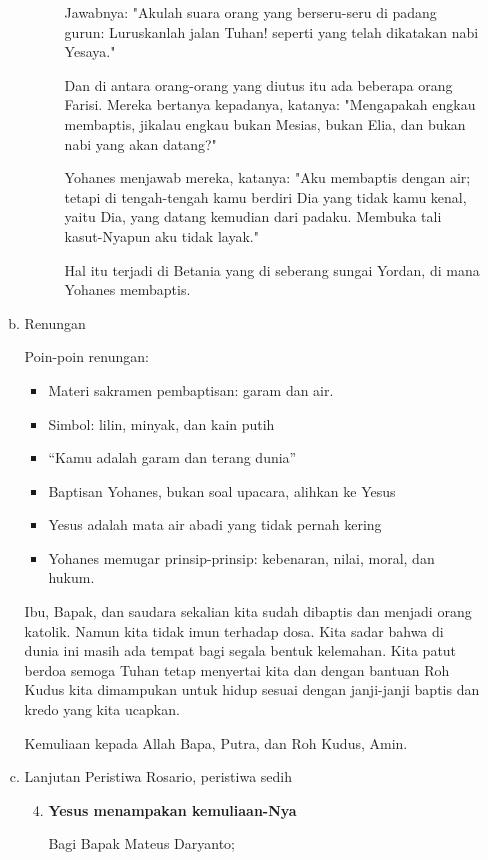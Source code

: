\documentclass[a5paper,titlepage,12pt]{scrbook}
\begin{document}
\begin{itemize}
\begin{enumerate}[a.]
\begin{description}
Jawabnya: "Akulah suara orang yang berseru-seru di padang gurun: Luruskanlah jalan Tuhan! seperti yang telah dikatakan nabi Yesaya."

Dan di antara orang-orang yang diutus itu ada beberapa orang Farisi.
Mereka bertanya kepadanya, katanya: "Mengapakah engkau membaptis, jikalau engkau bukan Mesias, bukan Elia, dan bukan nabi yang akan datang?"

Yohanes menjawab mereka, katanya: "Aku membaptis dengan air; tetapi di tengah-tengah kamu berdiri Dia yang tidak kamu kenal,
yaitu Dia, yang datang kemudian dari padaku. Membuka tali kasut-Nyapun aku tidak layak."

Hal itu terjadi di Betania yang di seberang sungai Yordan, di mana Yohanes membaptis.

 
			\end{description}

		\item Renungan

Poin-poin renungan:
\begin{itemize}
\item Materi sakramen pembaptisan: garam dan air.
\item Simbol: lilin, minyak, dan kain putih
\item ``Kamu adalah garam dan terang dunia''
\item Baptisan Yohanes, bukan soal upacara, alihkan ke Yesus
\item Yesus adalah mata air abadi yang tidak pernah kering
\item Yohanes memugar prinsip-prinsip: kebenaran, nilai, moral, dan hukum.
\end{itemize}

Ibu, Bapak, dan saudara sekalian kita sudah dibaptis dan menjadi orang katolik. Namun kita tidak imun terhadap dosa. Kita sadar bahwa di dunia ini masih ada tempat bagi segala bentuk kelemahan. Kita patut berdoa semoga Tuhan tetap menyertai kita dan dengan bantuan Roh Kudus kita dimampukan untuk hidup sesuai dengan janji-janji baptis dan kredo yang kita ucapkan.

Kemuliaan kepada Allah Bapa, Putra, dan Roh Kudus, Amin.

	\item Lanjutan Peristiwa Rosario, peristiwa sedih 
		\begin{enumerate}[{Peristiwa }I.]
		    \setcounter{enumii}{3}
			\item \textbf{Yesus menampakan kemuliaan-Nya}

Bagi Bapak Mateus Daryanto;


\end{enumerate}
\end{enumerate}
\end{itemize}
\end{document}

